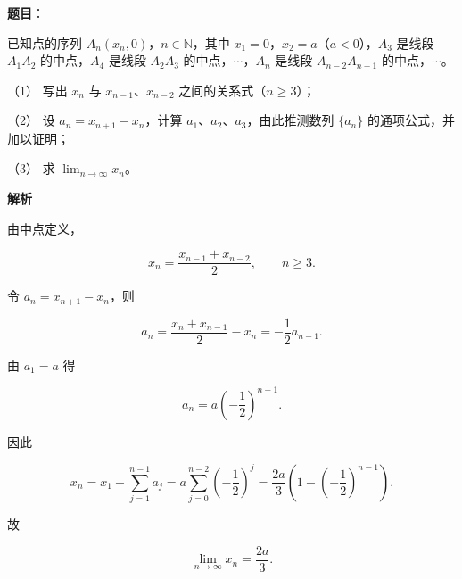 \begin{answer}

\textbf{题目}：

已知点的序列 $A_n(x_n,0)$，$n\in\mathbb N$，其中 $x_1=0$，$x_2=a$（$a<0$），$A_3$ 是线段 $A_1A_2$ 的中点，$A_4$ 是线段 $A_2A_3$ 的中点，$\cdots$，$A_n$ 是线段 $A_{n-2}A_{n-1}$ 的中点，$\cdots$。

（1） 写出 $x_n$ 与 $x_{n-1}\text{、}x_{n-2}$ 之间的关系式（$n\ge3$）；

（2） 设 $a_n=x_{n+1}-x_n$，计算 $a_1\text{、}a_2\text{、}a_3$，由此推测数列 $\{a_n\}$ 的通项公式，并加以证明；

（3） 求 $\displaystyle\lim_{n\to\infty}x_n$。

\textbf{解析}


由中点定义，

\nopagebreak[4]
\[
x_n=\frac{x_{n-1}+x_{n-2}}2,\qquad n\ge3.
\]


令 $a_n=x_{n+1}-x_n$，则

\nopagebreak[4]
\[
a_n=\frac{x_n+x_{n-1}}2-x_n=-\frac12a_{n-1}.
\]

由 $a_1=a$ 得

\nopagebreak[4]
\[
a_n=a\left(-\frac12\right)^{n-1}.
\]


因此

\nopagebreak[4]
\[
x_n=x_1+\sum_{j=1}^{n-1}a_j
=a\sum_{j=0}^{n-2}\left(-\frac12\right)^j
=\frac{2a}{3}\left(1-\left(-\frac12\right)^{n-1}\right).
\]

故

\nopagebreak[4]
\[
\lim_{n\to\infty}x_n=\frac{2a}{3}.
\]




\end{answer}